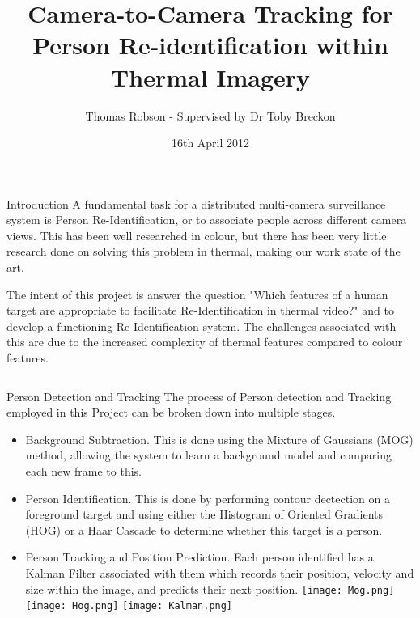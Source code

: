 \documentclass[final]{beamer}
\title[Thermal Re-ID]{Camera-to-Camera Tracking for Person Re-identification within Thermal Imagery}
\author[G Ingram]{Thomas Robson - Supervised by Dr Toby Breckon}
\institute[Durham]{School of Engineering and Computing Sciences, Durham University}
\date{16th April 2012}
\begin{document}
  \begin{frame}{} 

  \vfill
  \begin{block}{Introduction}
          A fundamental task for a distributed multi-camera surveillance system is Person Re-Identification, or to associate people across different camera views. This has been well researched in colour, but there has been very little research done on solving this problem in thermal, making our work state of the art. 

The intent of this project is answer the question "Which features of a human target are appropriate to facilitate Re-Identification in thermal video?" and to develop a functioning Re-Identification system. The challenges associated with this are due to the increased complexity of thermal features compared to colour features.
        \end{block}
        
    \begin{columns}[t]
      \begin{column}{.49\linewidth}
        
        \begin{block}{Person Detection and Tracking}
        	The process of Person detection and Tracking employed in this Project can be broken down into multiple stages. 
        	\begin{itemize}
        	\item Background Subtraction. This is done using the Mixture of Gaussians (MOG) method, allowing the system to learn a background model and comparing each new frame to this. 

        	\item Person Identification. This is done by performing contour dectection on a foreground target and using either the Histogram of Oriented Gradients (HOG) or a Haar Cascade to determine whether this target is a person.
        	
        	\item Person Tracking and Position Prediction. Each person identified has a Kalman Filter associated with them which records their position, velocity and size within the image, and predicts their next position. 
        \texttt{[image: Mog.png]}  
        \texttt{[image: Hog.png]}  
        \texttt{[image: Kalman.png]}
          \end{itemize}
        \end{block}
        




\end{column}
\end{columns}
\end{frame}
\end{document}
